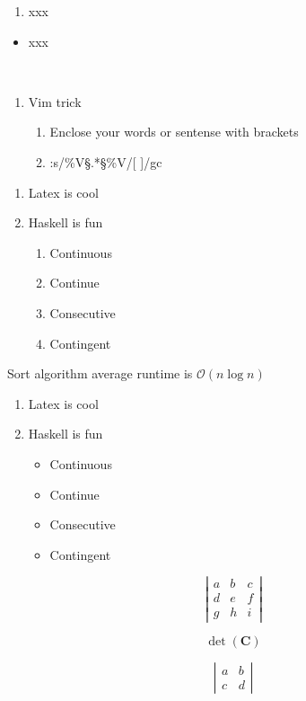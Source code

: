 \documentclass{article}
\begin{document}
 
\begin{enumerate}
\item xxx
\end{enumerate} 

\begin{itemize}
\item xxx
\end{itemize} 
\mathbf
\textbf
\mathbf
\mathbf
\mathbf
\
\mathbf{A} 
\mathbb{}
\mathbf

\begin{enumerate}
    \item Vim trick 
    \begin{enumerate}
        \item Enclose your words or sentense with brackets 
        \item :s/\%V\S.*\S\%V/[ \0 ]/gc 
    \end{enumerate}
\end{enumerate}

\begin{enumerate}
    \item Latex is cool
    \item Haskell is fun 
    \begin{enumerate}
    \item Continuous 
    \item Continue 
    \item Consecutive 
    \item Contingent 
    \end{enumerate} 
\end{enumerate} 
\m\mathbf{}
\m\mathbf{}
\m\math
\m\math
\m\math
\m\math
\m\math
\m\math
\mathbf
\mathbf
\mathbf 
\textbf
\textbf
\mathbf   

\mQuick Sort algorithm average runtime is $\mathcal{O}(n\log{}n)$
\begin{enumerate}
    \item Latex is cool
    \item Haskell is fun 
    \begin{itemize}
    \item Continuous 
    \item Continue 
    \item Consecutive 
    \item Contingent 
    \end{itemize} 
\end{enumerate} 
\mathbb{} 
\m\mathbf{}

\[      
    \left| \begin{array}{ccc}
    a & b & c \\
    d & e & f \\
    g & h & i \end{array} \right| 
\]
 

\[  \det (\mathbf{C})   \]

\[ \left| \begin{array}{cc}
a & b \\
c & d \end{array} \right| \] 
\end{document}
